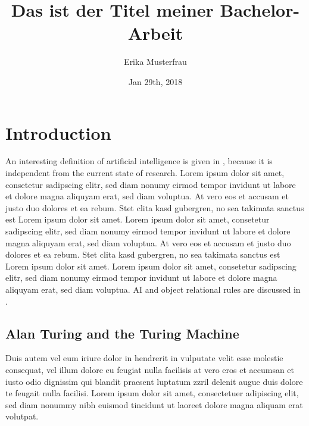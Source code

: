 \documentclass[11pt,twoside,a4paper,titlepage]{article}
\title{{Das ist der Titel meiner Bachelor-Arbeit}}
\author{Erika Musterfrau}
\date{Jan 29th, 2018}
\begin{document}
\setlength{\parindent}{0pt}


\cleardoublepage

\pagestyle{fancy}




\newpage


\tableofcontents
\cleardoublepage

\fancyhead[RO,LE]{\nouppercase{\leftmark}}
\fancyfoot[RO,LE]{\thepage}

\renewcommand{\headrulewidth}{0.5pt}

\setcounter{page}{1}

\newpage

\section{Introduction}

An interesting definition of artificial intelligence is given in \cite{Rich:MCG1983}, because it is independent from the current state of research. Lorem ipsum dolor sit amet, consetetur sadipscing elitr, sed diam nonumy eirmod tempor invidunt ut labore et dolore magna aliquyam erat, sed diam voluptua. At vero eos et accusam et justo duo dolores et ea rebum. Stet clita kasd gubergren, no sea takimata sanctus est Lorem ipsum dolor sit amet. Lorem ipsum dolor sit amet, consetetur sadipscing elitr, sed diam nonumy eirmod tempor invidunt ut labore et dolore magna aliquyam erat, sed diam voluptua. At vero eos et accusam et justo duo dolores et ea rebum. Stet clita kasd gubergren, no sea takimata sanctus est Lorem ipsum dolor sit amet. Lorem ipsum dolor sit amet, consetetur sadipscing elitr, sed diam nonumy eirmod tempor invidunt ut labore et dolore magna aliquyam erat, sed diam voluptua. AI and object relational rules are discussed in \cite{Kaelbling:AAAI2001}. \\  

\subsection{Alan Turing and the Turing Machine}

Duis autem vel eum iriure dolor in hendrerit in vulputate velit esse molestie consequat, vel illum dolore eu feugiat nulla facilisis at vero eros et accumsan et iusto odio dignissim qui blandit praesent luptatum zzril delenit augue duis dolore te feugait nulla facilisi. Lorem ipsum dolor sit amet, consectetuer adipiscing elit, sed diam nonummy nibh euismod tincidunt ut laoreet dolore magna aliquam erat volutpat.\\
\end{document}
